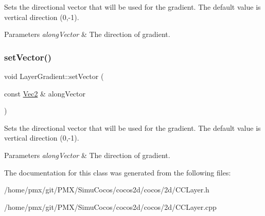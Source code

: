 Sets the directional vector that will be used for the gradient. The default value is vertical direction (0,-\/1).


\begin{DoxyParams}{Parameters}
{\em along\+Vector} & The direction of gradient. \\
\hline
\end{DoxyParams}
\mbox{\label{classLayerGradient_aefd1b00ca1d723c736bdb7a2ff4a802b}} 
\subsubsection{\texorpdfstring{set\+Vector()}{setVector()}\hspace{0.1cm}{\footnotesize\ttfamily [2/2]}}
{\footnotesize\ttfamily void Layer\+Gradient\+::set\+Vector (\begin{DoxyParamCaption}\item[{const \hyperlink{classVec2}{Vec2} \&}]{along\+Vector }\end{DoxyParamCaption})}

Sets the directional vector that will be used for the gradient. The default value is vertical direction (0,-\/1).


\begin{DoxyParams}{Parameters}
{\em along\+Vector} & The direction of gradient. \\
\hline
\end{DoxyParams}


The documentation for this class was generated from the following files\+:\begin{DoxyCompactItemize}
\item 
/home/pmx/git/\+P\+M\+X/\+Simu\+Cocos/cocos2d/cocos/2d/C\+C\+Layer.\+h\item 
/home/pmx/git/\+P\+M\+X/\+Simu\+Cocos/cocos2d/cocos/2d/C\+C\+Layer.\+cpp\end{DoxyCompactItemize}
